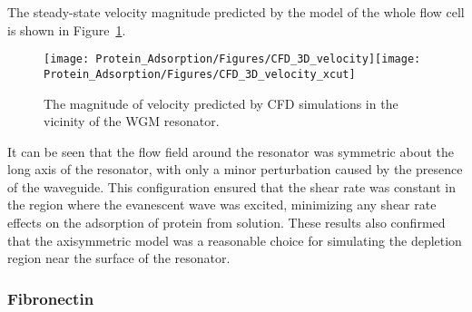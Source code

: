 The steady-state velocity magnitude predicted by the model of the
whole flow cell is shown in Figure~\ref{fig:CFD 3D velocity}.%
\begin{figure}
\texttt{[image: Protein\_Adsorption/Figures/CFD\_3D\_velocity]}\texttt{[image: Protein\_Adsorption/Figures/CFD\_3D\_velocity\_xcut]}

\caption{\label{fig:CFD 3D velocity}The magnitude of velocity predicted by
CFD simulations in the vicinity of the WGM resonator.}
%
\end{figure}
It can be seen that the flow field around the resonator was symmetric
about the long axis of the resonator, with only a minor perturbation
caused by the presence of the waveguide. This configuration ensured
that the shear rate was constant in the region where the evanescent
wave was excited, minimizing any shear rate effects on the adsorption
of protein from solution. These results also confirmed that the axisymmetric
model was a reasonable choice for simulating the depletion region
near the surface of the resonator.


\subsubsection{Fibronectin}

